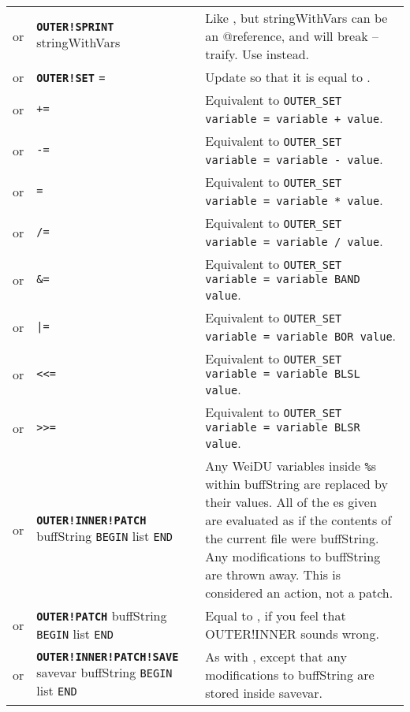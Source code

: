 \documentclass{article}
\def\ttref#1{\ahrefloc{#1}{\tt #1}}
\def\DEFINE#1{{\tt \bf #1}\label{#1}\index{#1}}
\def\t#1{{\tt #1}}
\def\Slist{{\color{red} list }}
\begin{document}
\begin{tabular}{cp{10in}|p{10in}}
or & \DEFINE{OUTER!SPRINT} \ttref{variable} stringWithVars &
  Like \ttref{OUTER!TEXT!SPRINT}, but stringWithVars can be an @reference, and will
  break --traify. Use \ttref{OUTER!TEXT!SPRINT} instead. \\
or & \DEFINE{OUTER!SET} \ttref{variable} \t{=} \ttref{value} &
  Update \ttref{variable} so that it is equal to \ttref{value}. \\
or & \ttref{OUTER!SET} \ttref{variable} \t{+=} \ttref{value} &
  Equivalent to \t{OUTER_SET variable = variable + value}. \\
or & \ttref{OUTER!SET} \ttref{variable} \t{-=} \ttref{value} &
  Equivalent to \t{OUTER_SET variable = variable - value}. \\
or & \ttref{OUTER!SET} \ttref{variable} \t{*=} \ttref{value} &
  Equivalent to \t{OUTER_SET variable = variable * value}. \\
or & \ttref{OUTER!SET} \ttref{variable} \t{/=} \ttref{value} &
  Equivalent to \t{OUTER_SET variable = variable / value}. \\
or & \ttref{OUTER!SET} \ttref{variable} \t{\&=} \ttref{value} &
  Equivalent to \t{OUTER_SET variable = variable BAND value}. \\
or & \ttref{OUTER!SET} \ttref{variable} \t{|=} \ttref{value} &
  Equivalent to \t{OUTER_SET variable = variable BOR value}. \\
or & \ttref{OUTER!SET} \ttref{variable} \t{<<=} \ttref{value} &
  Equivalent to \t{OUTER_SET variable = variable BLSL value}. \\
or & \ttref{OUTER!SET} \ttref{variable} \t{>>=} \ttref{value} &
  Equivalent to \t{OUTER_SET variable = variable BLSR value}. \\
or & \DEFINE{OUTER!INNER!PATCH} buffString \t{BEGIN} \ttref{patch} \Slist \t{END} &
  Any WeiDU variables inside \t{\%}s within buffString are replaced by
  their values. All of the \ttref{patch}es given are evaluated as if the
  contents of the current file were buffString. Any modifications to
  buffString are thrown away. This is considered an action, not a patch. \\
or & \DEFINE{OUTER!PATCH} buffString \t{BEGIN} \ttref{patch} \Slist \t{END} &
  Equal to \ttref{OUTER!INNER!PATCH}, if you feel that OUTER!INNER sounds wrong. \\
or & \DEFINE{OUTER!INNER!PATCH!SAVE} savevar buffString \t{BEGIN} \ttref{patch} \Slist \t{END} &
  As with \ttref{OUTER!INNER!PATCH}, except that any modifications to buffString are stored inside
  savevar. \\

\end{tabular}
\end{document}
